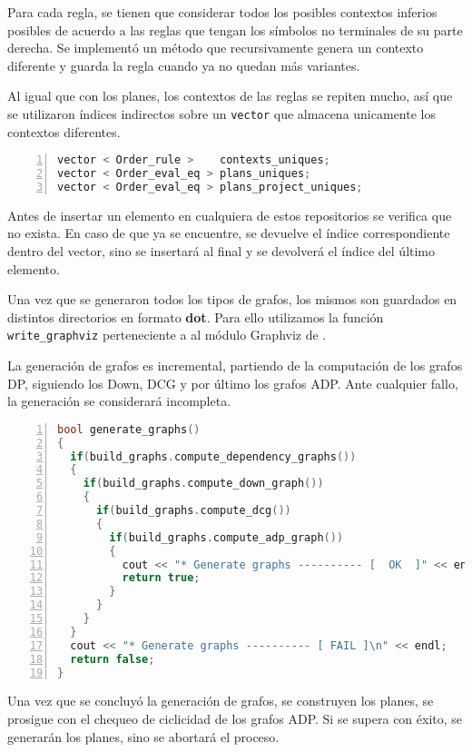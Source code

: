 Para cada regla, se tienen que considerar todos los posibles contextos inferios posibles de acuerdo a las reglas que tengan los símbolos no terminales de su parte derecha. Se implementó un método que recursivamente genera un contexto diferente y guarda la regla cuando ya no quedan más variantes.

Al igual que con los planes, los contextos de las reglas se repiten mucho, así que se utilizaron índices indirectos sobre un \texttt{vector} que almacena unicamente los contextos diferentes.

\begin{lstlisting}[language=C++, basicstyle=\scriptsize, numbers=left, numbersep=5pt, numberstyle=\tiny]
vector < Order_rule >    contexts_uniques;
vector < Order_eval_eq > plans_uniques;
vector < Order_eval_eq > plans_project_uniques;
\end{lstlisting}

Antes de insertar un elemento en cualquiera de estos repositorios se verifica que no exista. En caso de que ya se encuentre, se devuelve el índice correspondiente dentro del vector, sino se insertará al final y se devolverá el índice del último elemento.

Una vez que se generaron todos los tipos de grafos, los mismos son guardados en distintos directorios en formato \textbf{dot}\cite{dot}. Para ello utilizamos la función \texttt{write\_graphviz} perteneciente a al módulo Graphviz de \boost.

La generación de grafos es incremental, partiendo de la computación de los grafos DP, siguiendo los Down, DCG y por último los grafos ADP. Ante cualquier fallo, la generación se considerará incompleta.

\begin{lstlisting}[language=C++, basicstyle=\scriptsize, numbers=left, numbersep=5pt, numberstyle=\tiny]
bool generate_graphs()
{
  if(build_graphs.compute_dependency_graphs())
  {
    if(build_graphs.compute_down_graph())
    {
      if(build_graphs.compute_dcg())
      {
        if(build_graphs.compute_adp_graph())
        {
          cout << "* Generate graphs ---------- [  OK  ]" << endl;
          return true;
        }
      }
    }
  }
  cout << "* Generate graphs ---------- [ FAIL ]\n" << endl;
  return false;
}
\end{lstlisting}

Una vez que se concluyó la generación de grafos, se construyen los planes, se prosigue con el chequeo de ciclicidad de los grafos ADP. Si se supera con éxito, se generarán los planes, sino se abortará el proceso.

